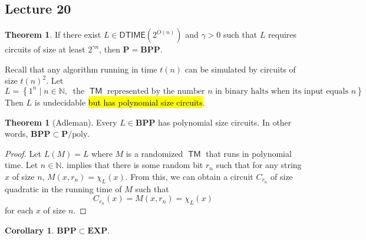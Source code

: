 \documentclass[10pt,letterpaper,cm]{nupset}
\theoremstyle{definition}
\theoremstyle{theorem}
\newtheorem{theorem}[definition]{Theorem}
\newtheorem{corollary}[definition]{Corollary}
\theoremstyle{remark}
\newcommand{\N}{\mathbb N}
\newcommand{\1}{\mathbf{1}}
\newcommand{\0}{\vec 0}
\DeclareMathOperator{\TM}{\mathsf{TM}}
\begin{document}
\subsection{Lecture 20}

\begin{theorem}
If there exist $L \in \mathsf{DTIME}(2^{O(n)})$ and $\gamma >0$ such that $L$ requires circuits of size at least $2^{\gamma{n}}$, then $\mathbf{P} = \mathbf{BPP}$.
\end{theorem}

\smallskip

Recall that any algorithm running in time $t(n)$ can be simulated by circuits of size $t(n)^2$. Let $$L = \left\{ 1^n \mid n \in \N, \ \text{ the }\TM\text{ represented by the number }n\text{ in binary halts when its input equals }n\right\}.$$ Then $L$ is undecidable \hl{but has polynomial size circuits}. 

\smallskip

\begin{theorem}[Adleman]
Every $L\in \mathbf{BPP}$ has polynomial size circuits. In other words, $\mathbf{BPP} \subset \mathbf{P}/\mathrm{poly}$.
\end{theorem}
\begin{proof}
Let $L(M)  = L$ where $M$ is a randomized $\TM$ that runs in polynomial time. Let $n\in \N$.  implies that there is some random bit $r_n$ such that for any string $x$ of size $n$, $M(x,r_n) = \chi_L(x)$. From this, we can obtain a circuit $C_{r_n}$ of size quadratic in the running time of $M$ such that $$C_{r_n}(x) = M(x,{r_n}) = \chi_L(x)$$ for each $x$ of size $n$.
\end{proof}

\begin{corollary}
$\mathbf{BPP} \subset \mathbf{EXP}$.
\end{corollary}
\end{document}
